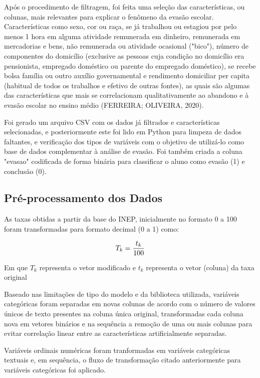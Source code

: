 \documentclass[english, spanish, brazilian]{RBIEarticle} %
\begin{document}
Após o procedimento de filtragem, foi feita uma seleção das características, ou colunas, mais relevantes para explicar o fenômeno da evasão escolar. Características como sexo, cor ou raça, se já trabalhou ou estagiou por pelo menos 1 hora em alguma atividade remunerada em dinheiro, remunerada em mercadorias e bens, não remunerada ou atividade ocasional ("bico"), número de componentes do domicílio (exclusive as pessoas cuja condição no domicílio era pensionista, empregado doméstico ou parente do empregado doméstico), se recebe bolsa família ou outro auxílio governamental e rendimento domiciliar per capita
(habitual de todos os trabalhos e efetivo de outras fontes), as quais são algumas das características que mais se correlacionam qualitativamente ao abandono e à evasão escolar no ensino médio (FERREIRA; OLIVEIRA, 2020).

Foi gerado um arquivo CSV com os dados já filtrados e características selecionadas, e posteriormente este foi lido em Python para limpeza de dados faltantes, e verificação dos tipos de variáveis com o objetivo de utilizá-lo como base de dados complementar à análise de evasão. Foi também criada a coluna "evasao" codificada de forma binária para classificar o aluno como evasão (1) e conclusão (0).


\subsection{Pré-processamento dos Dados}
As taxas obtidas a partir da base do INEP, inicialmente no formato 0 a 100 foram transformadas para formato decimal (0 a 1) como:

\vspace{0.5cm}
\begin{equation}
\large T_k = \frac{t_k}{100}
\end{equation}
\vspace{0.5cm}

Em que $T_k$ representa o vetor modificado e $t_k$ representa o vetor (coluna) da taxa original

Baseado nas limitações de tipo do modelo e da biblioteca utilizada, variáveis categóricas foram separadas em novas colunas de acordo com o número de valores únicos de texto presentes na coluna única original, transformadas cada coluna nova em vetores binários e na sequência a remoção de uma ou mais colunas para evitar correlação linear entre as características artificialmente separadas.  

Variáveis ordinais numéricas foram tranformadas em variáveis categóricas textuais e, em sequência, o fluxo de transformação citado anteriormente para variáveis categóricas foi aplicado.
\end{document}
